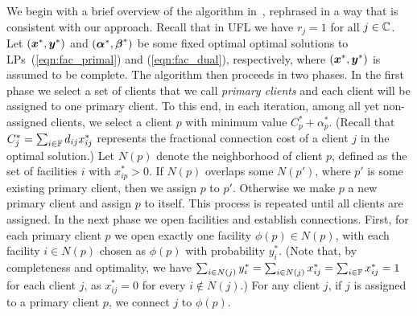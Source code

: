 \documentclass[11pt]{article}
\begin{document}
We begin with a brief overview of the algorithm
in~\cite{gupta08}, rephrased in a way that is consistent
with our approach.  Recall that in UFL we have $r_j=1$ for
all $j\in\mathbb{C}$. Let $(\boldsymbol{x}^\ast,\boldsymbol{y}^\ast)$ and
$(\boldsymbol{\alpha}^\ast,\boldsymbol{\beta}^\ast)$ be some fixed optimal optimal
solutions to LPs~(\ref{eqn:fac_primal}) and
(\ref{eqn:fac_dual}), respectively, where
$(\boldsymbol{x}^\ast,\boldsymbol{y}^\ast)$ is assumed to be complete. The
algorithm then proceeds in two phases. In the first phase we
select a set of clients that we call \emph{primary clients}
and each client will be assigned to one primary client. To
this end, in each iteration, among all yet non-assigned
clients, we select a client $p$ with minimum value
$C_p^\ast+\alpha_p^\ast$. (Recall that
$C_j^\ast=\sum_{i\in\mathbb{F}} d_{ij}x_{ij}^\ast$ represents
the fractional connection cost of a client $j$ in the
optimal solution.) Let $N(p)$ denote the neighborhood of
client $p$, defined as the set of facilities $i$ with
$x_{ip}^\ast>0$.  If $N(p)$ overlaps some $N(p')$, where
$p'$ is some existing primary client, then we assign $p$ to
$p'$. Otherwise we make $p$ a new primary client and assign
$p$ to itself. This process is repeated until all clients
are assigned. In the next phase we open facilities and
establish connections. First, for each primary client $p$ we
open exactly one facility $\phi(p)\in N(p)$, with each
facility $i\in N(p)$ chosen as $\phi(p)$ with probability
$y_i^\ast$. (Note that, by completeness and optimality, we
have $\sum_{i\in N(j)} y_i^\ast = \sum_{i\in N(j)}
x_{ij}^\ast= \sum_{i\in \mathbb{F}} x_{ij}^\ast = 1$ for each
client $j$, as $x_{ij}^\ast=0$ for every $i\notin N(j)$.)
For any client $j$, if $j$ is assigned to a primary client
$p$, we connect $j$ to $\phi(p)$.
\end{document}
